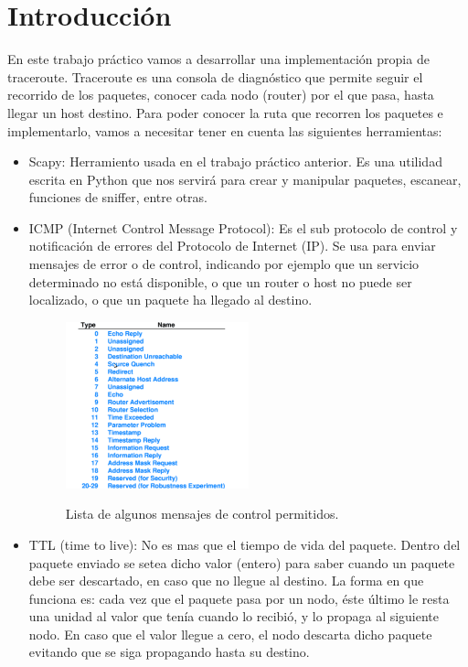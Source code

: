 \section{Introducci\'on}

En este trabajo pr\'actico vamos a desarrollar una implementaci\'on propia de traceroute. Traceroute es una consola de diagn\'ostico que permite seguir el recorrido de los paquetes, conocer cada nodo (router) por el que pasa, hasta llegar un host destino. Para poder conocer la ruta que recorren los paquetes e implementarlo, vamos a necesitar tener en cuenta las siguientes herramientas:

\begin{itemize}

\item Scapy: Herramiento usada en el trabajo pr\'actico anterior. Es una utilidad escrita en Python que nos servir\'a para crear y manipular paquetes, escanear, funciones de sniffer, entre otras.

\item ICMP (Internet Control Message Protocol): Es el sub protocolo de control y notificaci\'on de errores del Protocolo de Internet (IP). Se usa para enviar mensajes de error o de control, indicando por ejemplo que un servicio determinado no está disponible, o que un router o host no puede ser localizado, o que un paquete ha llegado al destino.
\begin{figure}[h]
	\begin{center}
    \includegraphics[width=0.5\textwidth]{ICMP_lista.png}
     \label{fig:ICMPlista} 
	\end{center}    
    \caption{Lista de algunos mensajes de control permitidos.}  
    
\end{figure}
\vspace{0.25cm}

\item TTL (time to live): No es mas que el tiempo de vida del paquete. Dentro del paquete enviado se setea dicho valor (entero) para saber cuando un paquete debe ser descartado, en caso que no llegue al destino. La forma en que funciona es: cada vez que el paquete pasa por un nodo, \'este \'ultimo le resta una unidad al valor que ten\'ia cuando lo recibi\'o, y lo propaga al siguiente nodo. En caso que el valor llegue a cero, el nodo descarta dicho paquete evitando que se siga propagando hasta su destino.


\end{itemize}
